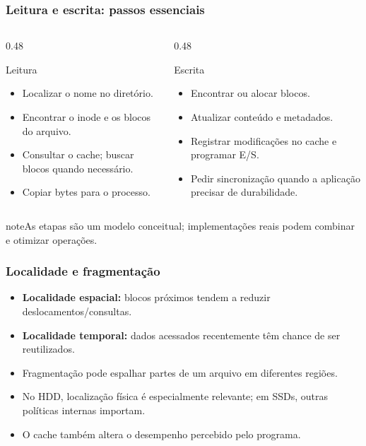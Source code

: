 \documentclass[aspectratio=169,11pt]{beamer}
\begin{document}
\begin{frame}
\frametitle{Leitura e escrita: passos essenciais}
\begin{columns}[T,onlytextwidth]
\begin{column}{0.48\textwidth}
\begin{block}{Leitura}\small\begin{itemize}
\item Localizar o nome no diretório.
\item Encontrar o inode e os blocos do arquivo.
\item Consultar o cache; buscar blocos quando necessário.
\item Copiar bytes para o processo.
\end{itemize}\end{block}\end{column}
\begin{column}{0.48\textwidth}
\begin{block}{Escrita}\small\begin{itemize}
\item Encontrar ou alocar blocos.
\item Atualizar conteúdo e metadados.
\item Registrar modificações no cache e programar E/S.
\item Pedir sincronização quando a aplicação precisar de durabilidade.
\end{itemize}\end{block}\end{column}\end{columns}
\vfill\begin{beamercolorbox}[wd=\textwidth,sep=2mm,rounded=true]{note}\small As etapas são um modelo conceitual; implementações reais podem combinar e otimizar operações.\end{beamercolorbox}

\end{frame}

\begin{frame}
\frametitle{Localidade e fragmentação}
\large
\begin{itemize}
\item \textbf{Localidade espacial:} blocos próximos tendem a reduzir deslocamentos/consultas.
\item \textbf{Localidade temporal:} dados acessados recentemente têm chance de ser reutilizados.
\item Fragmentação pode espalhar partes de um arquivo em diferentes regiões.
\item No HDD, localização física é especialmente relevante; em SSDs, outras políticas internas importam.
\item O cache também altera o desempenho percebido pelo programa.
\end{itemize}

\end{frame}
\end{document}
